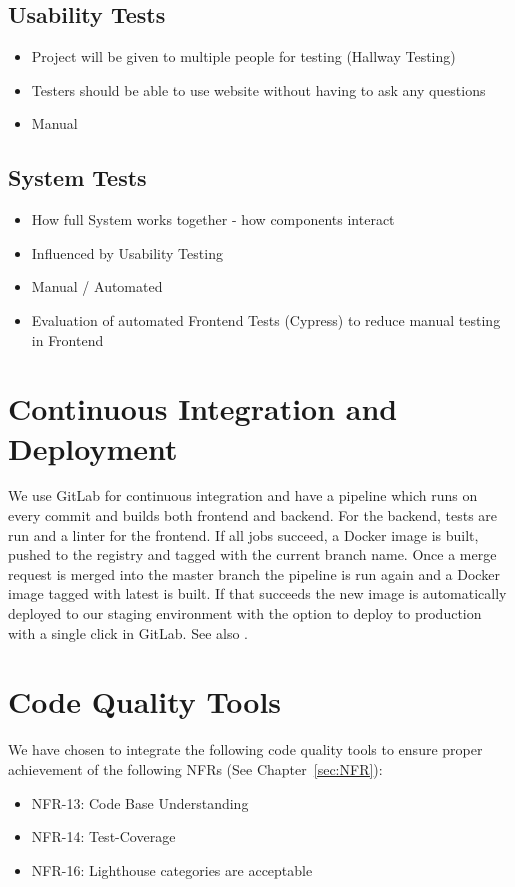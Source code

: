 \subsection{Usability Tests}
\begin{itemize}
    \item Project will be given to multiple people for testing (Hallway Testing)
    \item Testers should be able to use website without having to ask any questions
    \item Manual
\end{itemize}

\subsection{System Tests}
\begin{itemize}
    \item How full System works together - how components interact
    \item Influenced by Usability Testing
    \item Manual / Automated
    \item Evaluation of automated Frontend Tests (Cypress) to reduce manual testing in Frontend
\end{itemize}

\section{Continuous Integration and Deployment}
We use GitLab for continuous integration and have a pipeline which runs on every commit and builds both frontend and backend.
For the backend, tests are run and a linter for the frontend. If all jobs succeed, a Docker image is built, pushed to the registry and tagged with the current branch name.
Once a merge request is merged into the master branch the pipeline is run again and a Docker image tagged with latest is built.
If that succeeds the new image is automatically deployed to our staging environment with the option to deploy to production with a single click in GitLab. See also .

\section{Code Quality Tools}
We have chosen to integrate the following code quality tools to ensure proper achievement of the following NFRs (See Chapter~\ref{sec:NFR}):
\begin{itemize}
    \item NFR-13: Code Base Understanding
    \item NFR-14: Test-Coverage
    \item NFR-16: Lighthouse categories are acceptable
\end{itemize}

